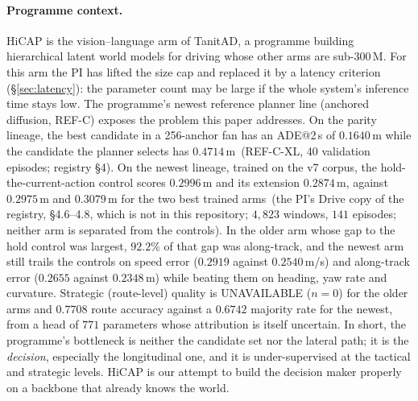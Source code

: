 \paragraph{Programme context.}
HiCAP is the vision--language arm of TanitAD, a programme building hierarchical latent world models for driving whose other arms are sub-300\,M. For this arm the PI has lifted the size cap and replaced it by a latency criterion (\S\ref{sec:latency}): the parameter count may be large if the whole system's inference time stays low.
The programme's newest reference planner line (anchored diffusion, REF-C) exposes the problem this paper addresses. On the parity
lineage, the best candidate in a 256-anchor fan has an ADE@2\,s of $0.1640$\,m while the candidate the planner selects has
$0.4714$\,m\evI~(REF-C-XL, 40 validation episodes; registry \S4). On the newest lineage, trained on the v7 corpus, the hold-the-current-action control scores $0.2996$\,m and its extension $0.2874$\,m, against $0.2975$\,m and $0.3079$\,m
for the two best trained arms\evI~(the PI's Drive copy of the registry, \S4.6--4.8, which is not in this repository; $4{,}823$ windows, $141$ episodes; neither arm is separated from the controls). In the older arm whose gap to the hold control was largest, $92.2\%$ of that gap was along-track\evI, and the newest arm still trails the controls on speed error ($0.2919$ against $0.2540$\,m/s) and along-track error ($0.2655$ against $0.2348$\,m) while beating them on heading, yaw rate and curvature\evI.
Strategic (route-level) quality is UNAVAILABLE ($n=0$) for the older arms and $0.7708$ route accuracy against a $0.6742$ majority rate for the newest\evI, from a head of $771$ parameters whose attribution is itself uncertain. In short, the
programme's bottleneck is neither the candidate set nor the lateral path; it is the \emph{decision}, especially the longitudinal one, and it is
under-supervised at the tactical and strategic levels. HiCAP is our attempt to build the decision maker properly on a backbone that already
knows the world.

